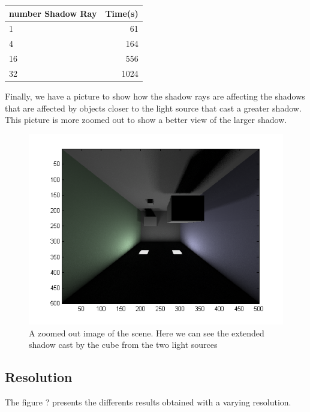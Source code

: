 \documentclass[12pt]{article}
\numberwithin{equation}{section}
\begin{document}
\begin{tabular}{| l | r |}
\hline
   number Shadow Ray & Time(s) \\
\hline
   1 & 61 \\
\hline
   4 & 164 \\
\hline
   16 & 556 \\
\hline   
   32 & 1024\\
\hline
 \end{tabular} 
 
 Finally, we have a picture to show how the shadow rays are affecting the shadows that are affected by objects closer to the light source that cast a greater shadow. This picture is more zoomed out to show a better view of the larger shadow.
 
 
\begin{figure}
  \begin{center}
    \includegraphics[scale=0.5]{../result/Shadow Ray/shadowrayszoom.png}
    \caption{A zoomed out image of the scene. Here we can see the extended shadow cast by the cube from the two light sources}
    \label{fig:shadowrayzoom}
  \end{center}
\end{figure}
 
 
 
\subsection{Resolution}

The figure ? presents the differents results obtained with a varying resolution.
\end{document}
